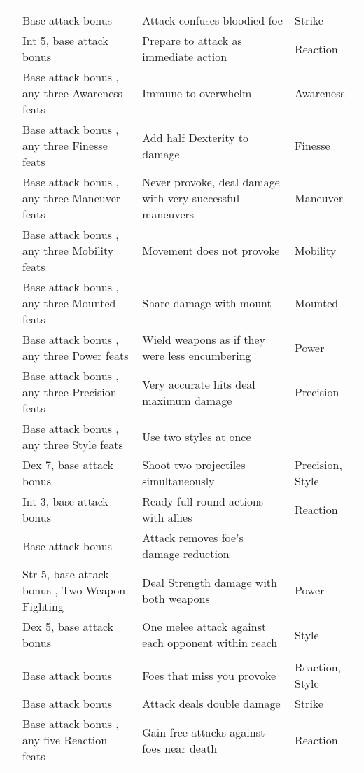 {\begin{longtabu}{>{\lcol}p{15em} >{\lcol}p{15em} >{\lcol}X >{\lcol}p{10em}}
\midrule
{} &  &  &  \\
 & Base attack bonus  & Attack confuses bloodied foe & Strike \\
 & Int 5, base attack bonus  & Prepare to attack as immediate action & Reaction \\
 & Base attack bonus , any three Awareness feats & Immune to overwhelm & Awareness \\
 & Base attack bonus , any three Finesse feats & Add half Dexterity to damage & Finesse \\
 & Base attack bonus , any three Maneuver feats & Never provoke, deal damage with very successful maneuvers & Maneuver \\ 
 & Base attack bonus , any three Mobility feats & Movement does not provoke & Mobility\\
 & Base attack bonus , any three Mounted feats & Share damage with mount & Mounted\\
 & Base attack bonus , any three Power feats & Wield weapons as if they were less encumbering & Power\\ 
 & Base attack bonus , any three Precision feats & Very accurate hits deal maximum damage & Precision\\ 
 & Base attack bonus , any three Style feats & Use two styles at once & \x \\
 & Dex 7, base attack bonus  & Shoot two projectiles simultaneously & Precision, Style \\
 & Int 3, base attack bonus  & Ready full-round actions with allies & Reaction \\
 & Base attack bonus  & Attack removes foe's damage reduction \\
 & Str 5, base attack bonus , Two-Weapon Fighting & Deal Strength damage with both weapons & Power \\
 & Dex 5, base attack bonus  & One melee attack against each opponent within reach & Style \\

\midrule
{} &  &  &  \\
 & Base attack bonus  & Foes that miss you provoke & Reaction, Style\\
 & Base attack bonus  & Attack deals double damage & Strike \\
 & Base attack bonus , any five Reaction feats & Gain free attacks against foes near death & Reaction \\
\end{longtabu}}

